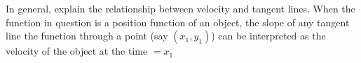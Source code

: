 {In general, explain the relationship between velocity and tangent lines.}
{When the function in question is a position function of an object, the slope of any tangent line the function through a point (say $(x_1,y_1)$) can be interpreted as the velocity of the object at the time $= x_1$}